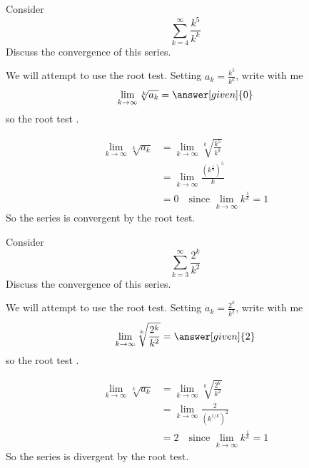\documentclass{ximera}
\begin{document}
\begin{example}
  Consider 
  \[
  \sum_{k=4}^\infty \frac{k^5}{k^k}
  \]
  Discuss the convergence of this series.
  \begin{explanation}
    We will attempt to use the root test. Setting
    $a_k=\frac{k^5}{k^k}$, write with me
    \[
    \lim_{k \to \infty} \sqrt[k]{a_k} = \answer[given]{0}	
    \]
    so the root test
	  .		
	  \begin{hint}
            \begin{align*}
	      \lim_{k \to \infty} \sqrt[k]{a_k} &= \lim_{k \to \infty} \sqrt[k]{\frac{k^5}{k^k}}\\
	      &=\lim_{k \to \infty} \frac{(k^{\frac{1}{k}})^5}{k}\\
	      &=0 \quad\text{since $\lim_{k \to \infty} k^\frac{1}{k} = 1$}
	    \end{align*}
	    So the series is convergent by the root test.
	  \end{hint}
  \end{explanation}
\end{example}

\begin{example}
  Consider 
  \[
  \sum_{k=3}^\infty \frac{2^k}{k^2}
  \]
  Discuss the convergence of this series.
  \begin{explanation}
    We will attempt to use the root test. Setting
    $a_k=\frac{2^k}{k^2}$, write with me
    \[
    \lim_{k \to \infty} \sqrt[k]{\frac{2^k}{k^2}} = \answer[given]{2}	
    \]
    so the root test
	  .		
	  \begin{hint}
            \begin{align*}
	      \lim_{k \to \infty} \sqrt[k]{a_k} &= \lim_{k \to \infty} \sqrt[k]{\frac{2^k}{k^2}}\\
	      &=\lim_{k \to \infty} \frac{2}{(k^{1/k})^2}\\
	      &=2 \quad\text{since $\lim_{k \to \infty} k^\frac{1}{k} = 1$}
	    \end{align*}
	    So the series is divergent by the root test.
	  \end{hint}
  \end{explanation}
\end{example}
\end{document}
